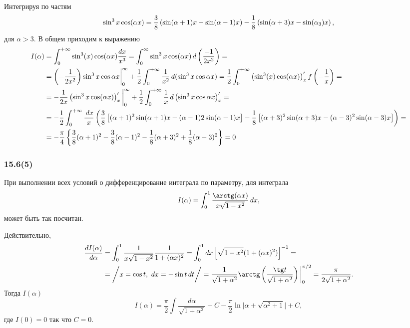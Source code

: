 Интегрируя по частям
\begin{equation*}
    \sin^3 x \cos (\alpha x) = \frac{3}{8} \left(
        \sin(\alpha+1)x - \sin (\alpha - 1)x
    \right) - \frac{1}{8} \left(
        \sin(\alpha+3)x - \sin(\alpha_3)x
    \right),
\end{equation*}
для $\alpha > 3$. В общем приходим к выражению
\begin{align*}
    I(\alpha) 
    &=
     \int_{0}^{+\infty}  \sin^3 (x) \cos (\alpha x) \frac{dx}{x^3}
    =
     \int_0^\infty \sin^3 x \cos(\alpha x) \, d \left(
        \frac{-1}{2x^2}
    \right) 
    = 
    \\
    &=
    \left(
        -\frac{1}{2x^2}
    \right) \sin^3 x \cos \alpha x \bigg|_0^\infty + \frac{1}{2} \int_{0}^{+\infty} 
    \frac{1}{x^2} \, d (\sin^3 x \cos \alpha x) = 
    \frac{1}{2} \int_{0}^{+\infty} \left(
        \sin^3 (x) \cos (\alpha x)
    \right)'_x  f\left(-\frac{1}{x}\right) 
    = 
    \\
    &= 
    - \frac{1}{2x} \left(
        \sin^3 x \cos(\alpha x)
    \right)'_x \bigg|_0^\infty + 
    \frac{1}{2} \int_{0}^{+\infty}  \frac{1}{x} \, d \left(
        \sin^3 x \cos \alpha x
    \right)'_x
    = 
    \\ 
    &=
    -\frac{1}{2} \int_{0}^{+\infty} \frac{\, d x}{x} \left(
        \frac{3}{8}\left[
            (\alpha+1)^2 \sin (\alpha+1)x - (\alpha-1)2 \sin (\alpha-1)x
        \right] - 
        \frac{1}{8}\left[
            (\alpha+3)^2 \sin (\alpha+3) x - (\alpha-3)^2 \sin  (\alpha-3)x
        \right]
    \right) 
    = \\
    &=
    -\frac{\pi}{4} \left\{
        \frac{3}{8} (\alpha+1)^2 - \frac{3}{8} (\alpha-1)^2 - \frac{1}{8} (\alpha + 3)^2+ \frac{1}{8} (\alpha-3)^2
    \right\} = 0 
\end{align*}


\subsubsection*{15.6(5)}
При выполнении всех условий о дифференцирование интеграла по параметру, для интеграла 
\begin{equation*}
    I(\alpha) = \int_0^1 \frac{\arctg (\alpha x)}{x \sqrt{1-x^2}} \d x,
\end{equation*}
может быть так посчитан. 

Действительно,
\begin{align*}
    \frac{d I(\alpha)}{d \alpha} 
    &=
    \int_0^1 \frac{1}{x \sqrt{1-x^2}} \frac{1}{1+(\alpha x)^2} 
    = 
    \int_0^1 dx \left[
        \sqrt{1-x^2} (1+ (\alpha x)^2)
    \right]^{-1}
    = \\ &=
    \bigg/
        x = \cos t, \ d x = - \sin t \d t
    \bigg/ = \frac{1}{\sqrt{1+\alpha^2}} \arctg \l(
        \frac{\tg t}{\sqrt{1+\alpha^2}}
    \r) \bigg|_0^{\pi/2} = \frac{\pi}{2 \sqrt{1+\alpha^2}}.
\end{align*}
Тогда $I(\alpha)$
\begin{equation*}
    I(\alpha) = \frac{\pi}{2} \int \frac{d \alpha}{\sqrt{1+\alpha^2}} + C -
    \frac{\pi}{2} \ln \bigg|
        \alpha + \sqrt{\alpha^2 + 1}
    \bigg| + C,
\end{equation*}
где $I(0) = 0$ так что $C = 0$.



